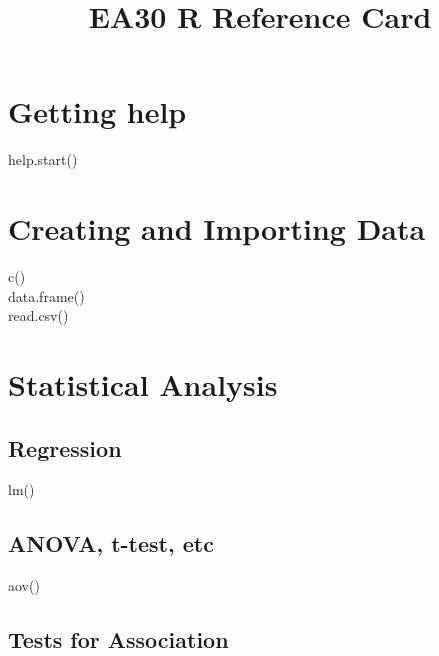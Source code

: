 \documentclass{article}
\title{EA30 R Reference Card}
\begin{document}

\maketitle

\begin{multicols}{3}


\section*{Getting help}

\begin{description}
  \item[help.start()]
\end{description}

\section*{Creating and Importing Data}

\begin{description}
\item[c()]
\item[data.frame()]
\item[read.csv()]
\end{description}

\section*{Statistical Analysis}

\subsection*{Regression}

\begin{description}
\item[lm()] 
\end{description}

\subsection*{ANOVA, t-test, etc}

\begin{description}
\item[aov()]
\end{description}

\subsection*{Tests for Association}


\end{multicols}
\end{document}
